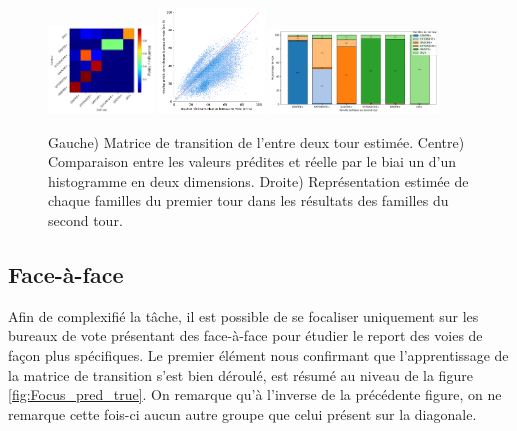 \documentclass[11pt]{article}
\begin{document}
            \begin{figure}[h]
                \begin{center}
                    \includegraphics[width=0.25\textwidth]{Famille_Matrice.pdf}
                    \includegraphics[width=0.25\textwidth]{Famille_True_Pred_Hist.pdf}
                    \includegraphics[width=0.4\textwidth]{Famille_Proportions.pdf}
                    \caption{Gauche) Matrice de transition de l'entre deux tour estimée. Centre) Comparaison entre les valeurs prédites et réelle par le biai un d'un histogramme en deux dimensions. Droite) Représentation estimée de chaque familles du premier tour dans les résultats des familles du second tour.}
                    \label{fig:Famille}
                \end{center}
            \end{figure}

        \subsection*{Face-à-face}

            Afin de complexifié la tâche, il est possible de se focaliser uniquement sur les bureaux de vote présentant des face-à-face pour étudier le report des voies de façon plus spécifiques. Le premier élément nous confirmant que l'apprentissage de la matrice de transition s'est bien déroulé, est résumé au niveau de la figure \ref{fig:Focus_pred_true}. On remarque qu'à l'inverse de la précédente figure, on ne remarque cette fois-ci aucun autre groupe que celui présent sur la diagonale.
\end{document}
